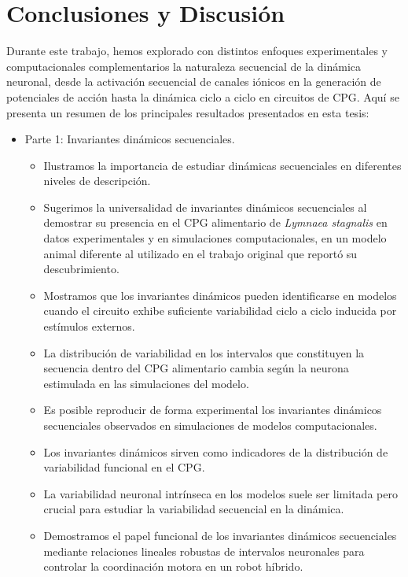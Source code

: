 \chapter{Conclusiones y Discusión} %

Durante este trabajo, hemos explorado con distintos enfoques experimentales y computacionales complementarios la naturaleza secuencial de la dinámica neuronal, desde la activación secuencial de canales iónicos en la generación de potenciales de acción hasta la dinámica ciclo a ciclo en circuitos de CPG. Aquí se presenta un resumen de los principales resultados presentados en esta tesis:

\begin{itemize}
	\item Parte 1: Invariantes dinámicos secuenciales.
	\begin{itemize}
		\item Ilustramos la importancia de estudiar dinámicas secuenciales en diferentes niveles de descripción.
		\item Sugerimos la universalidad de invariantes dinámicos secuenciales al demostrar su presencia en el CPG alimentario de \textit{Lymnaea stagnalis} en datos experimentales y en simulaciones computacionales, en un modelo animal diferente al utilizado en el trabajo original que reportó su descubrimiento.
		\item Mostramos que los invariantes dinámicos pueden identificarse en modelos cuando el circuito exhibe suficiente variabilidad ciclo a ciclo inducida por estímulos externos.
		\item La distribución de variabilidad en los intervalos que constituyen la secuencia dentro del CPG alimentario cambia según la neurona estimulada en las simulaciones del modelo.
		\item Es posible reproducir de forma experimental los invariantes dinámicos secuenciales observados en simulaciones de modelos computacionales.
		\item Los invariantes dinámicos sirven como indicadores de la distribución de variabilidad funcional en el CPG.
		\item La variabilidad neuronal intrínseca en los modelos suele ser limitada pero crucial para estudiar la variabilidad secuencial en la dinámica.
		\item Demostramos el papel funcional de los invariantes dinámicos secuenciales mediante relaciones lineales robustas de intervalos neuronales para controlar la coordinación motora en un robot híbrido.
	\end{itemize}
	

\end{itemize}
